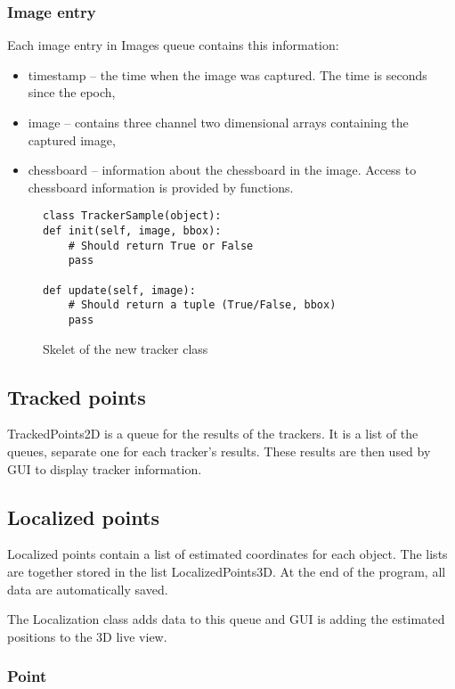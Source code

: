 \subsubsection*{Image entry}

Each image entry in Images queue contains this information: 
\begin{itemize}
\item timestamp -- the time when the image was captured. The time is seconds
since the epoch, \item image -- contains three channel two dimensional arrays
containing the captured image, \item chessboard -- information about the
chessboard in the image. Access to chessboard information is provided by
functions. 
\end{itemize}

\begin{figure}
\begin{verbatim}
class TrackerSample(object):
def init(self, image, bbox):
    # Should return True or False
    pass

def update(self, image):
    # Should return a tuple (True/False, bbox)
    pass
\end{verbatim}
\caption{Skelet of the new tracker class}
\label{fig:new-tracker}
\end{figure}

\subsection*{Tracked points}

TrackedPoints2D is a queue for the results of the trackers. It is a list of the
queues, separate one for each tracker's results. These results are then used by
GUI to display tracker information.

\subsection*{Localized points}

Localized points contain a list of estimated coordinates for each object. The
lists are together stored in the list LocalizedPoints3D. At the end of the
program, all data are automatically saved.

The Localization class adds data to this queue and GUI is adding the estimated
positions to the 3D live view.

\subsubsection*{Point}

